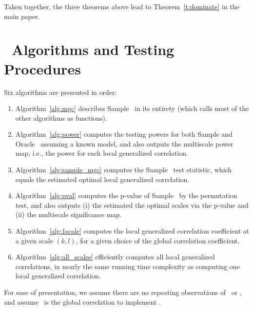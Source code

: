 \documentclass[11pt]{article}
\begin{document}
Taken together, the three theorems above lead to Theorem~\ref{t:dominate} in the main paper.


\clearpage

\section{\Mgc~Algorithms and Testing Procedures}
\label{appen:algorithms}


Six algorithms are presented in order:
\begin{enumerate}
\item Algorithm~\ref{alg:mgc} describes Sample \Mgc~in its entirety (which calls most of the other algorithms as functions). 
\item Algorithm~\ref{alg:power} computes the testing powers for both Sample and Oracle \Mgc~assuming a known model, and also outputs  the multiscale power map, i.e., the power for each local generalized correlation.
\item Algorithm~\ref{alg:sample_mgc} computes the Sample \Mgc~test statistic, which equals the estimated optimal local generalized correlation.
\item Algorithm~\ref{alg:pval} computes the p-value of Sample \Mgc~by the permutation test, and also outputs (i) the estimated the optimal scales via the p-value and (ii) the multiscale significance map. 
\item Algorithm~\ref{alg:1scale} computes the local generalized correlation coefficient at a given scale $(k,l)$, for a given choice of the global correlation coefficient.
\item Algorithm~\ref{alg:all_scales} efficiently computes all local generalized correlations, in nearly the same running time complexity as computing one local generalized correlation. 
\end{enumerate}
For ease of presentation, we assume there are no repeating observations of \mbx~or \mby, and assume \Mcorr~is the global correlation to implement \Mgc.
\end{document}
